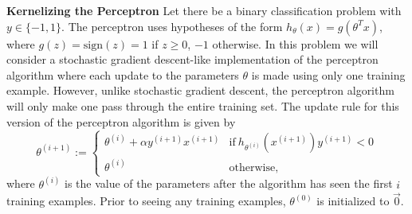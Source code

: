 \newpage
\item {} {\bf Kernelizing the Perceptron}
Let there be a binary classification problem with $y \in \{-1, 1\}$.  The
perceptron uses hypotheses of the form $h_\theta(x) = g(\theta^T x)$, where
$g(z) = \text{sign}(z) = 1$ if $z \ge 0$, $-1$ otherwise.  In this problem we
will consider a stochastic gradient descent-like implementation of the
perceptron algorithm where each update to the parameters $\theta$ is made using
only one training example.  However, unlike stochastic gradient descent, the
perceptron algorithm will only make one pass through the entire training set.
The update rule for this version of the perceptron algorithm is given by
\begin{equation*}
  \theta^{(i+1)} :=
  \begin{cases}
    \theta^{(i)} + \alpha y^{(i+1)} x^{(i+1)}
    & \mbox{if}~ h_{\theta^{(i)}}(x^{(i+1)}) y^{(i+1)} < 0 \\
    \theta^{(i)} & \mbox{otherwise},
  \end{cases}
\end{equation*}
where $\theta^{(i)}$ is the value of the parameters after the algorithm has
seen the first $i$ training examples. Prior to seeing any training examples,
$\theta^{(0)}$ is initialized to $\vec{0}$.
 
\begin{enumerate}
  
  
  
  
  
  
\end{enumerate}
